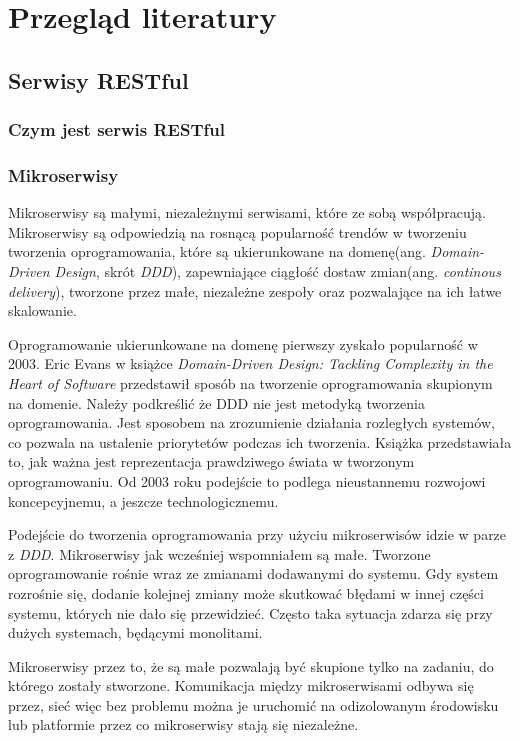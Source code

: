 \chapter{Przegląd literatury}

\section{Serwisy RESTful}
\subsection{Czym jest serwis RESTful}
\subsection{Mikroserwisy}
Mikroserwisy są małymi, niezależnymi serwisami, które ze sobą współpracują\cite{newman}. Mikroserwisy są odpowiedzią na rosnącą popularność trendów w tworzeniu tworzenia oprogramowania, które są ukierunkowane na domenę(ang. \textsl{Domain-Driven Design}, skrót \textsl{DDD}), zapewniające ciągłość dostaw zmian(ang. \textsl{continous delivery}), tworzone przez małe, niezależne zespoły oraz pozwalające na ich łatwe skalowanie. 

Oprogramowanie ukierunkowane na domenę pierwszy zyskało popularność w 2003. Eric Evans w książce \textsl{Domain-Driven Design: Tackling Complexity in the Heart of Software}\cite{ddd} przedstawił sposób na tworzenie oprogramowania skupionym na domenie. Należy podkreślić że DDD nie jest metodyką tworzenia oprogramowania. Jest sposobem na zrozumienie działania rozległych systemów, co pozwala na ustalenie priorytetów podczas ich tworzenia. Książka przedstawiała to, jak ważna jest reprezentacja prawdziwego świata w tworzonym oprogramowaniu. Od 2003 roku podejście to podlega nieustannemu rozwojowi koncepcyjnemu, a jeszcze technologicznemu.

Podejście do tworzenia oprogramowania przy użyciu mikroserwisów idzie w parze z \textsl{DDD}. Mikroserwisy jak wcześniej wspomniałem są małe. Tworzone oprogramowanie rośnie wraz ze zmianami dodawanymi do systemu. Gdy system rozrośnie się, dodanie kolejnej zmiany może skutkować błędami w innej części systemu, których nie dało się przewidzieć. Często taka sytuacja zdarza się przy dużych systemach, będącymi monolitami.

Mikroserwisy przez to, że są małe pozwalają być skupione tylko na zadaniu, do którego zostały stworzone. Komunikacja między mikroserwisami odbywa się przez, sieć więc bez problemu można je uruchomić na odizolowanym środowisku lub platformie przez co mikroserwisy stają się niezależne. 


